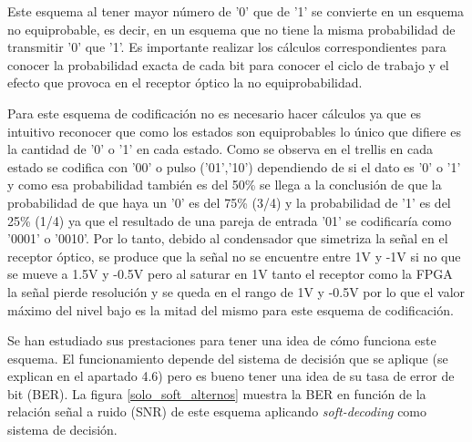 Este esquema al tener mayor número de '0' que de '1' se convierte en un esquema no 
equiprobable, es decir, en un esquema que no tiene la misma probabilidad de transmitir 
'0' que '1'. Es importante realizar los cálculos correspondientes para conocer la 
probabilidad exacta de cada bit para conocer el ciclo de trabajo y el efecto que 
provoca en el receptor óptico la no equiprobabilidad. 

Para este esquema de codificación no es necesario hacer cálculos ya que es 
intuitivo reconocer que como los estados son equiprobables lo único que difiere es la 
cantidad de '0' o '1' en cada estado. Como se observa en el trellis en cada estado se 
codifica con '00' o pulso ('01','10') dependiendo de si el dato es '0' o '1' y como esa
probabilidad también es del 50\% se llega a la conclusión de que la probabilidad de que
haya un '0' es del 75\% (3/4) y la probabilidad de '1' es del 25\% (1/4) ya que el 
resultado de una pareja de entrada '01' se codificaría como '0001' o '0010'. Por lo tanto,
debido al condensador que simetriza la señal en el receptor óptico, se produce que la 
señal no se encuentre entre 1V y -1V si no que se mueve a 1.5V y -0.5V pero al saturar 
en 1V tanto el receptor como la FPGA la señal pierde resolución y se queda en el 
rango de 1V y -0.5V por lo que el valor máximo del nivel bajo es la mitad del mismo
para este esquema de codificación.

Se han estudiado sus prestaciones para tener una idea de cómo funciona este esquema. 
El funcionamiento depende del sistema de decisión que se aplique (se 
explican en el apartado 4.6) pero es bueno tener una idea de su tasa de error de bit (BER).
La figura \ref{solo_soft_alternos} muestra la BER en función de la 
relación señal a ruido
(SNR) de este esquema aplicando \textit{soft-decoding} como sistema de 
decisión. 

